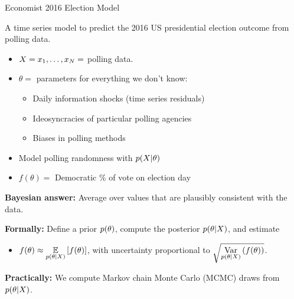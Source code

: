 
\begin{frame}{Economist 2016 Election Model \citep{economist:2020:election}}

\begin{minipage}[t]{0.35\textwidth}
    \ElectionData{}
\end{minipage}
\begin{minipage}{0.04\textwidth}
\hfill
\end{minipage}
\begin{minipage}[t]{0.59\textwidth}

A time series model to predict the 2016 US presidential election
outcome from polling data.

\spskip
\begin{itemize}
\item $X = x_1, \ldots, x_N =$ polling data.
\item $\theta = $ parameters for everything we don't know:
%
\begin{itemize}
\item Daily information shocks (time series residuals)
\item Ideosyncracies of particular polling agencies
\item Biases in polling methods
\end{itemize}
%
\item Model polling randomness with $p(X | \theta)$
\item $f(\theta) = $ Democratic \% of vote on election day
\end{itemize}
%
\end{minipage}

\pause

\pause
\textbf{Bayesian answer: }
    Average over values that are plausibly consistent with the data.

\pause
\textbf{Formally:} Define a prior $p(\theta)$, 
compute the posterior $p(\theta \vert X)$, and estimate
%
\begin{itemize}
\item[] $f(\theta) \approx \underset{p(\theta \vert X)}{\mathbb{E}}\left[f(\theta)\right]$, with 
uncertainty proportional to $\sqrt{\underset{p(\theta \vert X)}{\mathrm{Var}}\left(f(\theta)\right)}$.
\end{itemize}
\pause
\textbf{Practically:} We compute Markov chain Monte Carlo (MCMC) draws from
$p(\theta \vert X)$.


\end{frame}



